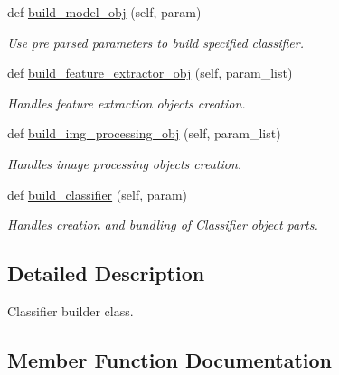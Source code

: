 \begin{DoxyCompactItemize}
def \mbox{\hyperlink{classclassifier__builder_1_1_classifier_builder_a2a0e440e5571f9b38fc72ecc5b649031}{build\+\_\+model\+\_\+obj}} (self, param)
\begin{DoxyCompactList}\small\item\em Use pre parsed parameters to build specified classifier. \end{DoxyCompactList}\item 
def \mbox{\hyperlink{classclassifier__builder_1_1_classifier_builder_a11c5a2c5d6d8bf7c820b72f3f90114fe}{build\+\_\+feature\+\_\+extractor\+\_\+obj}} (self, param\+\_\+list)
\begin{DoxyCompactList}\small\item\em Handles feature extraction objects creation. \end{DoxyCompactList}\item 
def \mbox{\hyperlink{classclassifier__builder_1_1_classifier_builder_a1c124dd02af8615f45da7099e53a06bc}{build\+\_\+img\+\_\+processing\+\_\+obj}} (self, param\+\_\+list)
\begin{DoxyCompactList}\small\item\em Handles image processing objects creation. \end{DoxyCompactList}\item 
def \mbox{\hyperlink{classclassifier__builder_1_1_classifier_builder_a20430f35e6efbabb66b55f61318046ba}{build\+\_\+classifier}} (self, param)
\begin{DoxyCompactList}\small\item\em Handles creation and bundling of Classifier object parts. \end{DoxyCompactList}\end{DoxyCompactItemize}


\subsection{Detailed Description}
Classifier builder class. 



\subsection{Member Function Documentation}
\mbox{\label{classclassifier__builder_1_1_classifier_builder_a20430f35e6efbabb66b55f61318046ba}} 
